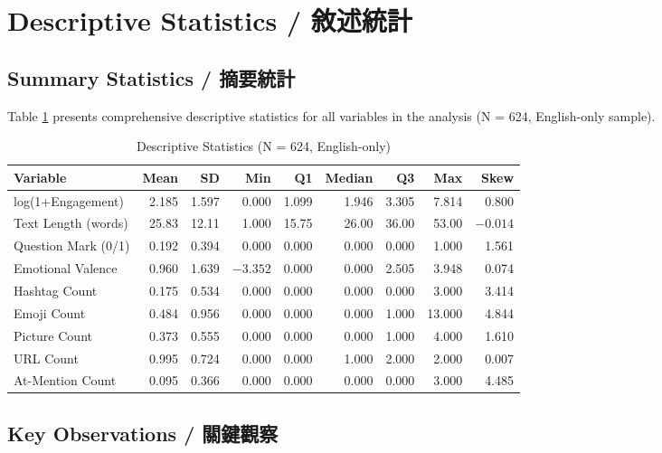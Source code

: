 \documentclass[12pt,a4paper]{article}
\begin{document}
\newpage

\section{Descriptive Statistics / 敘述統計}

\subsection{Summary Statistics / 摘要統計}

Table \ref{tab:desc_full} presents comprehensive descriptive statistics for all variables in the analysis (N = 624, English-only sample).

\begin{table}[H]
\centering
\caption{Descriptive Statistics (N = 624, English-only)}
\label{tab:desc_full}
\small
\begin{tabular}{lrrrrrrrr}
\toprule
Variable & Mean & SD & Min & Q1 & Median & Q3 & Max & Skew \\
\midrule
log(1+Engagement) & 2.185 & 1.597 & 0.000 & 1.099 & 1.946 & 3.305 & 7.814 & 0.800 \\
Text Length (words) & 25.83 & 12.11 & 1.000 & 15.75 & 26.00 & 36.00 & 53.00 & $-0.014$ \\
Question Mark (0/1) & 0.192 & 0.394 & 0.000 & 0.000 & 0.000 & 0.000 & 1.000 & 1.561 \\
Emotional Valence & 0.960 & 1.639 & $-3.352$ & 0.000 & 0.000 & 2.505 & 3.948 & 0.074 \\
Hashtag Count & 0.175 & 0.534 & 0.000 & 0.000 & 0.000 & 0.000 & 3.000 & 3.414 \\
Emoji Count & 0.484 & 0.956 & 0.000 & 0.000 & 0.000 & 1.000 & 13.000 & 4.844 \\
Picture Count & 0.373 & 0.555 & 0.000 & 0.000 & 0.000 & 1.000 & 4.000 & 1.610 \\
URL Count & 0.995 & 0.724 & 0.000 & 0.000 & 1.000 & 2.000 & 2.000 & 0.007 \\
At-Mention Count & 0.095 & 0.366 & 0.000 & 0.000 & 0.000 & 0.000 & 3.000 & 4.485 \\
\bottomrule
\end{tabular}
\end{table}

\subsection{Key Observations / 關鍵觀察}
\end{document}
